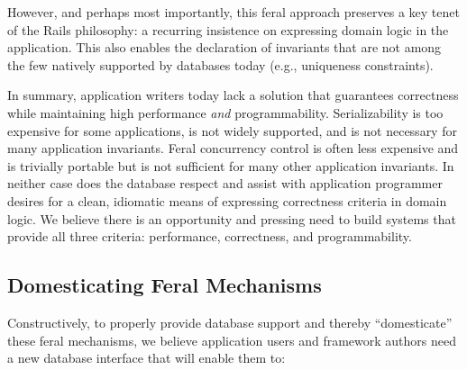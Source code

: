 \begin{impenumerate}
  However, and perhaps most importantly, this feral approach preserves
  a key tenet of the Rails philosophy: a recurring insistence on
  expressing domain logic in the application. This also enables the
  declaration of invariants that are not among the few natively
  supported by databases today (e.g., uniqueness constraints).
\end{impenumerate}

In summary, application writers today lack a solution that guarantees
correctness while maintaining high performance \textit{and}
programmability. Serializability is too expensive for some
applications, is not widely supported, and is not necessary for many
application invariants. Feral concurrency control is often less
expensive and is trivially portable but is not sufficient for many other
application invariants. In neither case does the database respect and
assist with application programmer desires for a clean, idiomatic
means of expressing correctness criteria in domain logic. We believe
there is an opportunity and pressing need to build systems that
provide all three criteria: performance, correctness, and
programmability.

\subsection{Domesticating Feral Mechanisms}

Constructively, to properly provide database support and thereby
``domesticate'' these feral mechanisms, we believe application users
and framework authors need a new database interface that will enable
them to:

